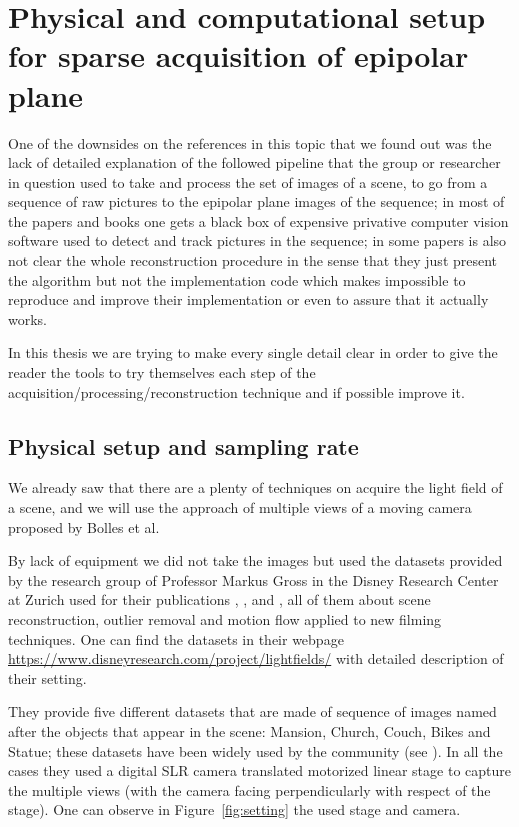 \section{Physical and computational setup for sparse acquisition of epipolar plane}
\label{sec:Sparse-acquisition}

One of the downsides on the references in this topic that we found out was the lack of detailed explanation of the followed pipeline that the group or researcher in question used to take and process the set of images of a scene, to go from a sequence of raw pictures to the epipolar plane images of the sequence; in most of the papers and books one gets a black box of expensive privative computer vision software used to detect and track pictures in the sequence; in some papers is also not clear the whole reconstruction procedure in the sense that they just present the algorithm but not the implementation code which makes impossible to reproduce and improve their implementation or even to assure that it actually works.

\bigskip

In this thesis we are trying to make every single detail clear in order to give the reader the tools to try themselves each step of the acquisition/processing/reconstruction technique and if possible improve it. 

\subsection{Physical setup and sampling rate}
\label{sec:phys_setup_sampling_rate}

We already saw that there are a plenty of techniques on acquire the light field of a scene, and we will use the approach of multiple views of a moving camera proposed by Bolles et al.\ 

\bigskip 

By lack of equipment we did not take the images but used the datasets provided by the research group of Professor Markus Gross in the Disney Research Center at Zurich used for their publications \cite{ChangilPhD}, \cite{PointCloud}, \cite{SceneRec} and \cite{StructMot}, all of them about scene reconstruction, outlier removal and motion flow applied to new filming techniques. One can find the datasets in their webpage \url{https://www.disneyresearch.com/project/lightfields/} with detailed description of their setting. 

\bigskip

They provide five different datasets that are made of sequence of images named after the objects that appear in the scene: Mansion, Church, Couch, Bikes and Statue; these datasets have been widely used by the community (see \cite{LF-Shearlets}). In all the cases they used a digital SLR camera translated motorized linear stage to capture the multiple views (with the camera facing perpendicularly with respect of the stage). One can observe in Figure~\ref{fig:setting} the used stage and camera.

